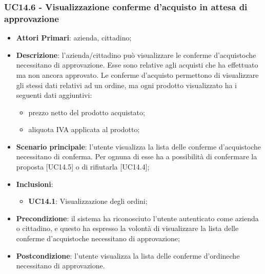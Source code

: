 \subsubsection{UC14.6 - Visualizzazione conferme d'acquisto in attesa di 
approvazione}
\begin{itemize}
	\item \textbf{Attori Primari}: azienda, cittadino;
	\item \textbf{Descrizione}: l'azienda/cittadino può visualizzare le conferme d'acquisto\glosp che necessitano di approvazione. Esse sono relative agli acquisti che ha effettuato ma non ancora approvato. Le conferme d'acquisto permettono di visualizzare gli stessi dati relativi ad un ordine, ma ogni prodotto visualizzato ha i seguenti dati aggiuntivi:
	\begin{itemize}
		\item prezzo netto del prodotto acquistato;	
		\item aliquota IVA applicata al prodotto;
	\end{itemize}
	\item \textbf{Scenario principale}: l'utente visualizza la lista delle 
	conferme d'acquisto\glosp che necessitano di conferma. Per ognuna di esse 
	ha a possibilità di confermare la proposta [UC14.5] o di rifiutarla 
	[UC14.4];
	\item \textbf{Inclusioni}:
	\begin{itemize}
		\item \textbf{UC14.1}: Visualizzazione degli ordini;
	\end{itemize}
	\item \textbf{Precondizione}: il sistema ha riconosciuto l'utente autenticato come azienda o cittadino, e questo ha espresso la volontà di visualizzare la lista delle conferme d'acquisto\glosp che necessitano di approvazione;
	\item \textbf{Postcondizione}: l'utente visualizza la lista delle conferme d'ordine\glosp che necessitano di approvazione.
\end{itemize}





